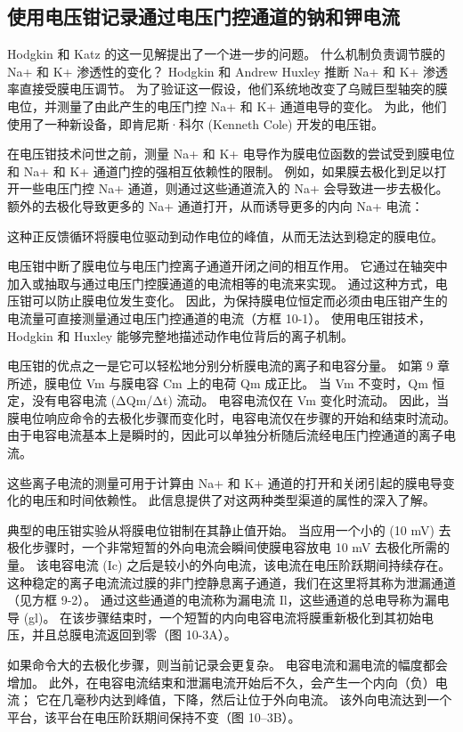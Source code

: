 \subsection{使用电压钳记录通过电压门控通道的钠和钾电流}
Hodgkin 和 Katz 的这一见解提出了一个进一步的问题。 什么机制负责调节膜的 Na+ 和 K+ 渗透性的变化？ Hodgkin 和 Andrew Huxley 推断 Na+ 和 K+ 渗透率直接受膜电压调节。 为了验证这一假设，他们系统地改变了乌贼巨型轴突的膜电位，并测量了由此产生的电压门控 Na+ 和 K+ 通道电导的变化。 为此，他们使用了一种新设备，即肯尼斯·科尔 (Kenneth Cole) 开发的电压钳。

在电压钳技术问世之前，测量 Na+ 和 K+ 电导作为膜电位函数的尝试受到膜电位和 Na+ 和 K+ 通道门控的强相互依赖性的限制。 例如，如果膜去极化到足以打开一些电压门控 Na+ 通道，则通过这些通道流入的 Na+ 会导致进一步去极化。 额外的去极化导致更多的 Na+ 通道打开，从而诱导更多的内向 Na+ 电流：

这种正反馈循环将膜电位驱动到动作电位的峰值，从而无法达到稳定的膜电位。

电压钳中断了膜电位与电压门控离子通道开闭之间的相互作用。 它通过在轴突中加入或抽取与通过电压门控膜通道的电流相等的电流来实现。 通过这种方式，电压钳可以防止膜电位发生变化。 因此，为保持膜电位恒定而必须由电压钳产生的电流量可直接测量通过电压门控通道的电流（方框 10-1）。 使用电压钳技术，Hodgkin 和 Huxley 能够完整地描述动作电位背后的离子机制。

电压钳的优点之一是它可以轻松地分别分析膜电流的离子和电容分量。 如第 9 章所述，膜电位 Vm 与膜电容 Cm 上的电荷 Qm 成正比。 当 Vm 不变时，Qm 恒定，没有电容电流 (ΔQm/Δt) 流动。 电容电流仅在 Vm 变化时流动。 因此，当膜电位响应命令的去极化步骤而变化时，电容电流仅在步骤的开始和结束时流动。 由于电容电流基本上是瞬时的，因此可以单独分析随后流经电压门控通道的离子电流。

这些离子电流的测量可用于计算由 Na+ 和 K+ 通道的打开和关闭引起的膜电导变化的电压和时间依赖性。 此信息提供了对这两种类型渠道的属性的深入了解。

典型的电压钳实验从将膜电位钳制在其静止值开始。 当应用一个小的 (10 mV) 去极化步骤时，一个非常短暂的外向电流会瞬间使膜电容放电 10 mV 去极化所需的量。 该电容电流 (Ic) 之后是较小的外向电流，该电流在电压阶跃期间持续存在。 这种稳定的离子电流流过膜的非门控静息离子通道，我们在这里将其称为泄漏通道（见方框 9-2）。 通过这些通道的电流称为漏电流 Il，这些通道的总电导称为漏电导 (gl)。 在该步骤结束时，一个短暂的内向电容电流将膜重新极化到其初始电压，并且总膜电流返回到零（图 10-3A）。

如果命令大的去极化步骤，则当前记录会更复杂。 电容电流和漏电流的幅度都会增加。 此外，在电容电流结束和泄漏电流开始后不久，会产生一个内向（负）电流； 它在几毫秒内达到峰值，下降，然后让位于外向电流。 该外向电流达到一个平台，该平台在电压阶跃期间保持不变（图 10–3B）。

